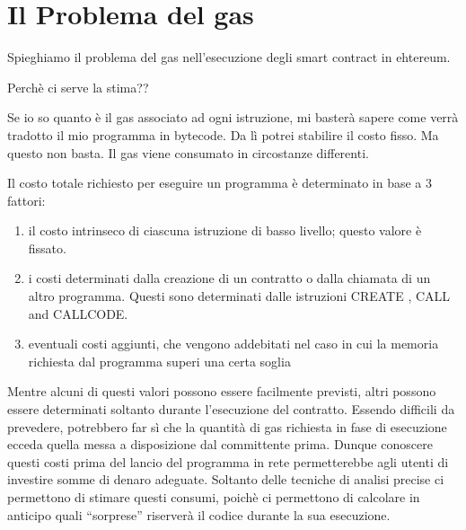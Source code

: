 \section{Il Problema del gas}

Spieghiamo il problema del gas nell'esecuzione degli smart contract in ehtereum.

Perchè ci serve la stima??

Se io so quanto è il gas associato ad ogni istruzione, mi basterà sapere come verrà tradotto il mio programma in bytecode. Da lì potrei stabilire il costo fisso. Ma questo non basta.
Il gas viene consumato in circostanze differenti.

Il costo totale richiesto per eseguire un programma è determinato in base a 3 fattori:
\begin{enumerate}
\item il costo intrinseco di ciascuna istruzione di basso livello; questo valore è fissato.
\item i costi determinati dalla creazione di un contratto o dalla chiamata di un altro programma. Questi sono determinati dalle istruzioni CREATE , CALL and CALLCODE.
\item eventuali costi aggiunti, che vengono addebitati nel caso in cui la memoria richiesta dal programma superi una certa soglia
\end{enumerate}

Mentre alcuni di questi valori possono essere facilmente previsti, altri possono essere determinati soltanto durante l'esecuzione del contratto. Essendo difficili da prevedere, potrebbero far sì che la quantità di gas richiesta in fase di esecuzione ecceda quella messa a disposizione dal committente prima. Dunque conoscere questi costi prima del lancio del programma in rete permetterebbe agli utenti di investire somme di denaro adeguate.\newline
\indent Soltanto delle tecniche di analisi precise ci permettono di stimare questi consumi, poichè ci permettono di calcolare in anticipo quali ``sorprese'' riserverà il codice durante la sua esecuzione.\newline

